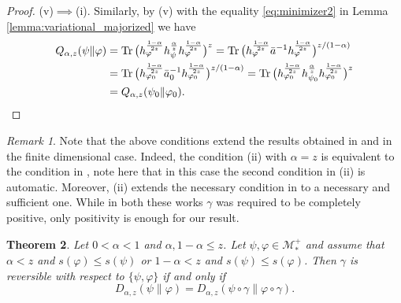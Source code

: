 \documentclass[12pt]{article}
\newtheorem{theorem}{Theorem}[section]
\theoremstyle{definition}
\theoremstyle{remark}
\newtheorem{remark}[theorem]{Remark}
\numberwithin{equation}{section}
\def\Me{\mathcal M}
\def \Tr{\mathrm{Tr}\,}
\def\ffi{\varphi}
\begin{document}
\begin{proof}
(v)$\implies$(i).\enspace
Similarly, by (v) with the equality \eqref{eq:minimizer2} in Lemma
\ref{lemma:variational_majorized} we have
\begin{align*}
Q_{\alpha,z}(\psi\|\ffi)
&=\Tr\bigl(h_\ffi^{1-\alpha\over2z}h_\psi^{\alpha\over z}h_\ffi^{1-\alpha\over2z}\bigr)^z
=\Tr\bigl(h_\ffi^{1-\alpha\over2z}\bar a^{-1}h_\ffi^{1-\alpha\over2z}\bigr)^{z/(1-\alpha)} \\
&=\Tr\bigl(h_{\ffi_0}^{1-\alpha\over2z}\bar a_0^{-1}h_{\ffi_0}^{1-\alpha\over2z}\bigr)^{z/(1-\alpha)}
=\Tr\bigl(h_{\ffi_0}^{1-\alpha\over2z}h_{\psi_0}^{\alpha\over z}h_{\ffi_0}^{1-\alpha\over2z}\bigr)^z \\
&=Q_{\alpha,z}(\psi_0\|\ffi_0).
\end{align*}
\end{proof}


\begin{remark}\label{rem:conditions} Note that the above conditions extend the results
obtained in \cite{leditzky2017data} and \cite{zhang2020equality} in
the finite dimensional case.
Indeed, the condition (ii) with $\alpha=z$ is equivalent to the condition in \cite[Thm.
1]{leditzky2017data}, note here that in this case the second condition in (ii) is
automatic. Moreover, (ii) extends the necessary condition in \cite[Thm. 1.2
(2)]{zhang2020equality} to a necessary and sufficient one. While in both these
 works $\gamma$ was required to be completely positive,  only
positivity is enough for our result. 

\end{remark}





\begin{theorem}\label{thm:suffle1} Let $0<\alpha<1$ and $\alpha,1-\alpha\le
z$. Let $\psi,\varphi\in \Me_*^+$ and assume that $\alpha<z$ and $s(\ffi)\le
s(\psi)$ or $1-\alpha<z$ and $s(\psi)\le s(\ffi)$. 
Then $\gamma$ is reversible with respect to
$\{\psi,\varphi\}$ if and only if
\[
D_{\alpha,z}(\psi\|\varphi)=D_{\alpha,z}(\psi\circ\gamma\|\varphi\circ\gamma).
\]

\end{theorem}
\end{document}

